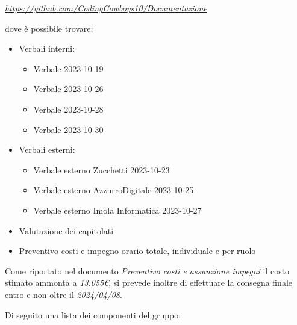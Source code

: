 \documentclass[12pt]{article}
\begin{document}
\begin{center}
\textit{\url{https://github.com/CodingCowboys10/Documentazione}}
\end{center}
\begin{flushleft}
dove è possibile trovare:\\
\begin{itemize}
    \item Verbali interni:
    \begin{itemize}
       \item Verbale 2023-10-19
       \item Verbale 2023-10-26
       \item Verbale 2023-10-28
       \item Verbale 2023-10-30
    \end{itemize}
    \item Verbali esterni:
    \begin{itemize}
       \item Verbale esterno Zucchetti 2023-10-23
       \item Verbale esterno AzzurroDigitale 2023-10-25
       \item Verbale esterno Imola Informatica 2023-10-27
    \end{itemize}
    \item Valutazione dei capitolati
    \item Preventivo costi e impegno orario totale, individuale e per ruolo
\end{itemize}
\newpage
Come riportato nel documento \textit{Preventivo costi e assunzione impegni} il costo stimato ammonta a \textit{13.055€}, si prevede inoltre di effettuare la consegna finale entro e non oltre il \textit{2024/04/08}.\\
\end{flushleft}
\begin{flushleft}
Di seguito una lista dei componenti del gruppo:
\end{flushleft}
\end{document}
